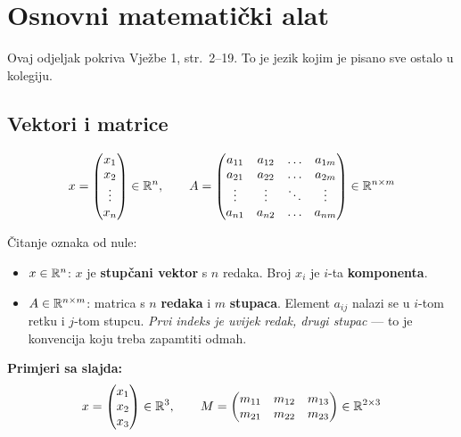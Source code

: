 \section{Osnovni matematički alat}
\label{sec:alat}

Ovaj odjeljak pokriva Vježbe 1, str.\ 2--19. To je jezik kojim je pisano sve
ostalo u kolegiju.

\subsection{Vektori i matrice}

\begin{definicija}
\[
x = \begin{pmatrix} x_1 \\ x_2 \\ \vdots \\ x_n \end{pmatrix} \in \mathbb{R}^n,
\qquad
A = \begin{pmatrix}
a_{11} & a_{12} & \dots & a_{1m} \\
a_{21} & a_{22} & \dots & a_{2m} \\
\vdots & \vdots & \ddots & \vdots \\
a_{n1} & a_{n2} & \dots & a_{nm}
\end{pmatrix} \in \mathbb{R}^{n \times m}
\]
\end{definicija}

Čitanje oznaka od nule:

\begin{itemize}
  \item $x \in \mathbb{R}^n$: $x$ je \textbf{stupčani vektor} s $n$ redaka. Broj
        $x_i$ je $i$-ta \textbf{komponenta}.
  \item $A \in \mathbb{R}^{n \times m}$: matrica s $n$ \textbf{redaka} i $m$
        \textbf{stupaca}. Element $a_{ij}$ nalazi se u $i$-tom retku i $j$-tom
        stupcu. \emph{Prvi indeks je uvijek redak, drugi stupac} --- to je
        konvencija koju treba zapamtiti odmah.
\end{itemize}

\textbf{Primjeri sa slajda:}
\[
x = \begin{pmatrix} x_1 \\ x_2 \\ x_3 \end{pmatrix} \in \mathbb{R}^3,
\qquad
M = \begin{pmatrix} m_{11} & m_{12} & m_{13} \\
                    m_{21} & m_{22} & m_{23} \end{pmatrix} \in \mathbb{R}^{2\times 3}
\]

